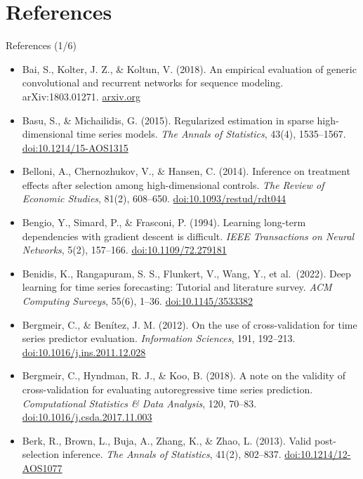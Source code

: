 \section{References}

\begin{frame}{References (1/6)}
\itemsize{\tiny}
\begin{itemize}
    \item Bai, S., Kolter, J. Z., \& Koltun, V. (2018). An empirical evaluation of generic convolutional and recurrent networks for sequence modeling. arXiv:1803.01271. \href{https://arxiv.org/abs/1803.01271}{arxiv.org}
    \item Basu, S., \& Michailidis, G. (2015). Regularized estimation in sparse high-dimensional time series models. \textit{The Annals of Statistics}, 43(4), 1535--1567. \href{https://doi.org/10.1214/15-AOS1315}{doi:10.1214/15-AOS1315}
    \item Belloni, A., Chernozhukov, V., \& Hansen, C. (2014). Inference on treatment effects after selection among high-dimensional controls. \textit{The Review of Economic Studies}, 81(2), 608--650. \href{https://doi.org/10.1093/restud/rdt044}{doi:10.1093/restud/rdt044}
    \item Bengio, Y., Simard, P., \& Frasconi, P. (1994). Learning long-term dependencies with gradient descent is difficult. \textit{IEEE Transactions on Neural Networks}, 5(2), 157--166. \href{https://doi.org/10.1109/72.279181}{doi:10.1109/72.279181}
    \item Benidis, K., Rangapuram, S. S., Flunkert, V., Wang, Y., et al.\ (2022). Deep learning for time series forecasting: Tutorial and literature survey. \textit{ACM Computing Surveys}, 55(6), 1--36. \href{https://doi.org/10.1145/3533382}{doi:10.1145/3533382}
    \item Bergmeir, C., \& Benítez, J. M. (2012). On the use of cross-validation for time series predictor evaluation. \textit{Information Sciences}, 191, 192--213. \href{https://doi.org/10.1016/j.ins.2011.12.028}{doi:10.1016/j.ins.2011.12.028}
    \item Bergmeir, C., Hyndman, R. J., \& Koo, B. (2018). A note on the validity of cross-validation for evaluating autoregressive time series prediction. \textit{Computational Statistics \& Data Analysis}, 120, 70--83. \href{https://doi.org/10.1016/j.csda.2017.11.003}{doi:10.1016/j.csda.2017.11.003}
    \item Berk, R., Brown, L., Buja, A., Zhang, K., \& Zhao, L. (2013). Valid post-selection inference. \textit{The Annals of Statistics}, 41(2), 802--837. \href{https://doi.org/10.1214/12-AOS1077}{doi:10.1214/12-AOS1077}

\end{itemize}
\end{frame}

